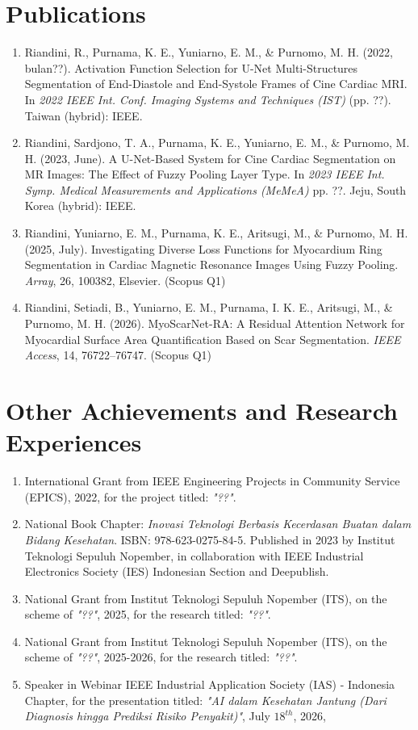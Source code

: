 \section*{Publications}

\begin{enumerate}
	\item Riandini, R., Purnama, K. E., Yuniarno, E. M., \& Purnomo, M. H. (2022, \large{bulan??}). Activation Function Selection for U-Net Multi-Structures Segmentation of End-Diastole and End-Systole Frames of Cine Cardiac MRI. In \textit{2022 IEEE Int. Conf. Imaging Systems and Techniques (IST)} (pp. ??). Taiwan (hybrid): IEEE.
	
	\item Riandini, Sardjono, T. A., Purnama, K. E., Yuniarno, E. M., \& Purnomo, M. H. (2023, June). A U-Net-Based System for Cine Cardiac Segmentation on MR Images: The Effect of Fuzzy Pooling Layer Type. In \textit{2023 IEEE Int. Symp. Medical Measurements and Applications (MeMeA)} \large{pp. ??}. Jeju, South Korea (hybrid): IEEE.
	
	\item Riandini, Yuniarno, E. M., Purnama, K. E., Aritsugi, M., \& Purnomo, M. H. (2025, July). Investigating Diverse Loss Functions for Myocardium Ring Segmentation in Cardiac Magnetic Resonance Images Using Fuzzy Pooling. \textit{Array}, 26, 100382, Elsevier. (Scopus Q1)
	
	\item Riandini, Setiadi, B., Yuniarno, E. M., Purnama, I. K. E., Aritsugi, M., \& Purnomo, M. H. (2026). MyoScarNet-RA: A Residual Attention Network for Myocardial Surface Area Quantification Based on Scar Segmentation. \textit{IEEE Access}, 14, 76722–76747. (Scopus Q1)
\end{enumerate}

\section*{Other Achievements and Research Experiences}
\begin{enumerate}
	\item International Grant from IEEE Engineering Projects in Community Service (EPICS), 2022, for the project titled: \textit{"\large{??}"}.
	\item National Book Chapter: \textit{Inovasi Teknologi Berbasis Kecerdasan Buatan dalam Bidang Kesehatan}. ISBN: 978-623-0275-84-5. Published in 2023 by Institut Teknologi Sepuluh Nopember, in collaboration with IEEE Industrial Electronics Society (IES) Indonesian Section and Deepublish.
	\item National Grant from Institut Teknologi Sepuluh Nopember (ITS), on the scheme of \textit{"\large{??}"}, 2025, for the research titled: \textit{"\large{??}"}.
	\item National Grant from Institut Teknologi Sepuluh Nopember (ITS), on the scheme of \textit{"\large{??}"}, 2025-2026, for the research titled: \textit{"\large{??}"}.
	\item Speaker in Webinar IEEE Industrial Application Society (IAS) - Indonesia Chapter, for the presentation titled: \textit{"AI dalam Kesehatan Jantung (Dari Diagnosis hingga Prediksi Risiko Penyakit)"}, July  $18^{th}$, 2026, 
\end{enumerate}
